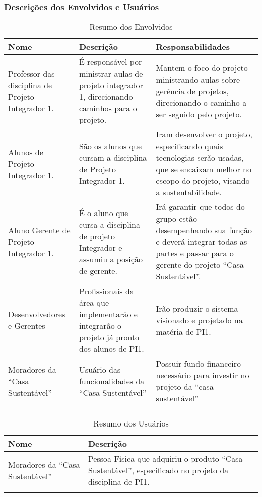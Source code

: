 \subsubsection{Descrições dos Envolvidos e Usuários}


\begin{longtable}{|m{5cm}|m{5cm}|m{5cm}|}
	\hline \textbf{Nome} & \textbf{Descrição} & \textbf{Responsabilidades}\\
	\hline Professor das disciplina de Projeto Integrador 1. & É responsável por ministrar aulas de projeto integrador
	1, direcionando caminhos para o projeto. & Mantem o foco do projeto ministrando aulas sobre gerência de projetos,
	direcionando o caminho a ser seguido pelo projeto. \\
	\hline Alunos de  Projeto Integrador 1. & São os alunos que cursam a disciplina de  Projeto Integrador 1. & Iram
	desenvolver o projeto, especificando quais tecnologias serão usadas, que se encaixam melhor no escopo do projeto,
	visando a sustentabilidade.\\
	\hline Aluno Gerente de Projeto Integrador 1. & É o aluno que cursa a disciplina de projeto Integrador e assumiu a
	posição de gerente. & Irá garantir que todos do grupo estão desempenhando sua função e deverá integrar todas as
	partes e passar para o gerente do projeto “Casa Sustentável”.\\
	\hline Desenvolvedores e Gerentes & Profissionais da área que implementarão e integrarão o projeto já pronto dos
	alunos de PI1. & Irão produzir o sistema visionado e projetado na matéria de PI1.\\
	\hline Moradores da “Casa Sustentável” & Usuário das funcionalidades da “Casa Sustentável” & Possuir fundo
	financeiro necessário para investir no projeto da “casa sustentável”\\
	\hline
\caption{Resumo dos Envolvidos}
\label{Resumo_dos_Envolvidos}
\end{longtable}


\begin{longtable}{|m{5cm}|m{10cm}|}
	\hline \textbf{Nome} & \textbf{Descrição}\\
	\hline Moradores da “Casa Sustentável” & Pessoa Física que adquiriu o produto “Casa Sustentável”, especificado no
	projeto da disciplina de PI1.\\
	\hline
\caption{Resumo dos Usuários}
\label{Resumo_dos_Usuarios}
\end{longtable}

